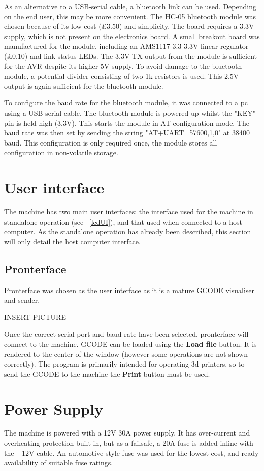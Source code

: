 As an alternative to a USB-serial cable, a bluetooth link can be used. Depending on the end user, this may be more convenient. The HC-05 bluetooth module was
chosen because of its low cost (\pounds 3.50) and simplicity. The board requires a 3.3V supply, which is not present on the electronics board. A small
breakout board was manufactured for the module, including an AMS1117-3.3 3.3V linear regulator (\pounds 0.10) and link status LEDs. The 3.3V TX output from the module is sufficient
for the AVR despite its higher 5V supply. To avoid damage to the bluetooth module, a potential divider consisting of two 1k resistors is used. This 2.5V output is
again sufficient for the bluetooth module.

To configure the baud rate for the bluetooth module, it was connected to a pc using a USB-serial cable. The bluetooth module is powered up whilst the "KEY" pin is held high (3.3V).
This starts the module in AT configuration mode. The baud rate was then set by sending the string "AT+UART=57600,1,0" at 38400 baud. This configuration is only required once,
the module stores all configuration in non-volatile storage.

\section{User interface}
The machine has two main user interfaces: the interface used for the machine in 
standalone operation (see ~\ref{lcdUI}), and that used when connected to a host computer.
As the standalone operation has already been described, this section will only
detail the host computer interface.

\subsection{Pronterface}
Pronterface was chosen as the user interface as it is a mature GCODE visualiser
and sender.

INSERT PICTURE

Once the correct serial port and baud rate have been selected, pronterface will connect
to the machine. GCODE can be loaded using the \textbf{Load file} button. It is 
rendered to the center of the window (however some operations are not shown correctly).
The program is primarily intended for operating 3d printers, so to send the GCODE
to the machine the \textbf{Print} button must be used.

\section{Power Supply}
The machine is powered with a 12V 30A power supply. It has over-current and overheating protection built in, but as a failsafe, a 20A fuse is added inline with the +12V cable. 
An automotive-style fuse was used for the lowest cost, and ready availability of suitable fuse ratings.

